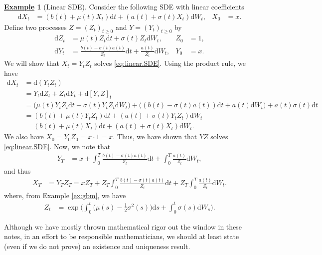 \documentclass[12pt]{book}
\numberwithin{equation}{chapter}
\theoremstyle{plain}
\numberwithin{theorem}{section}
\theoremstyle{definition}
\newtheorem{example}[theorem]{\underline{Example}}
\numberwithin{exercise}{chapter}
\newcommand{\<}{\langle}
\renewcommand{\>}{\rangle}
\renewcommand{\(}{\left(}
\renewcommand{\)}{\right)}
\renewcommand{\[}{\left[}
\renewcommand{\]}{\right]}
\newcommand\sig{\sigma}
\newcommand\dd{\mathrm{d}}
\begin{document}
\begin{example}[Linear SDE]
Consider the following SDE with linear coefficients
\begin{align}
\dd X_t
	&=	\( b(t) + \mu(t) X_t \) \dd t + \( a(t) + \sig(t) X_t \) \dd W_t , &
X_0
	&=	x . \label{eq:linear.SDE}
\end{align}
Define two processes $Z = (Z_t)_{t \geq 0}$ and $Y=(Y_t)_{t \geq 0}$ by
\begin{align}
\dd Z_t
	&=	\mu(t) Z_t \dd t + \sig(t) Z_t \dd W_t , &
Z_0
	&=	1 , \\
\dd Y_t
	&=	\frac{b(t) - \sig(t) a(t) }{Z_t} \dd t + \frac{a(t)}{Z_t} \dd W_t , &
Y_0
	&=	x .
\end{align}
We will show that $X_t = Y_t Z_t$ solves \eqref{eq:linear.SDE}.
Using the product rule, we have
\begin{align}
\dd X_t
	&=	\dd ( Y_t Z_t ) \\
	&=	Y_t \dd Z_t + Z_t \dd Y_t + \dd [Y,Z]_t \\
	&=	\Big( \mu(t) Y_t Z_t \dd t + \sig(t) Y_t Z_t \dd W_t \Big) 
			+ \Big( \( b(t) - \sig(t) a(t) \) \dd t + a(t) \dd W_t \Big) 
			+ a(t) \sig(t) \dd t \\
	&=	\( b(t) + \mu(t) Y_t Z_t \) \dd t + \( a(t) + \sig(t) Y_t Z_t \) \dd W_t \\
	&=	\( b(t) + \mu(t) X_t \) \dd t + \( a(t) + \sig(t) X_t \) \dd W_t .
\end{align}
We also have $X_0 = Y_0 Z_0 = x \cdot 1 = x$.  Thus, we have shown that $YZ$ solves \eqref{eq:linear.SDE}.
Now, we note that
\begin{align}
Y_T
	&=	x + \int_0^T \frac{b(t) - \sig(t) a(t) }{Z_t} \dd t + \int_0^T \frac{a(t)}{Z_t} \dd W_t ,
\end{align}
and thus
\begin{align}
X_T
	&=	Y_T Z_T 
	=	x Z_T + Z_T \int_0^T \frac{b(t) - \sig(t) a(t) }{Z_t} \dd t + Z_T \int_0^T \frac{a(t)}{Z_t} \dd W_t .
\end{align}
where, from Example \ref{ex:gbm}, we have
\begin{align}
Z_t
	&=	\exp \Big( \int_0^t \big( \mu(s) - \tfrac{1}{2} \sig^2(s) \big) \dd s + \int_0^t \sig(s)  \dd W_s \Big) .
\end{align}
\end{example}

\noindent
Although we have mostly thrown mathematical rigor out the window in these notes, in an effort to be responsible mathematicians, we should at least state (even if we do not prove) an existence and uniqueness result.
\end{document}
